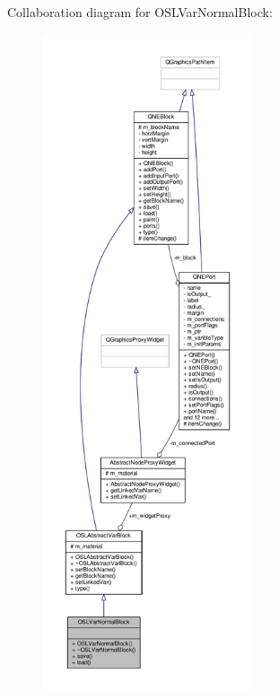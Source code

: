 Collaboration diagram for O\-S\-L\-Var\-Normal\-Block\-:
\nopagebreak
\begin{figure}[H]
\begin{center}
\leavevmode
\includegraphics[height=550pt]{class_o_s_l_var_normal_block__coll__graph}
\end{center}
\end{figure}
